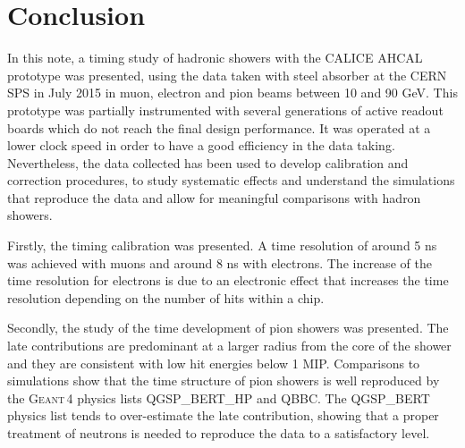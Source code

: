 \documentclass{JINST}
\newcommand\geant{\textsc{Geant\,4}\xspace}
\newcommand\ddhep{\textsc{DD4hep}\xspace}
\begin{document}

\section{Conclusion}

In this note, a timing study of hadronic showers with the CALICE AHCAL prototype was presented, using the data taken with steel absorber at the CERN SPS in July 2015 in muon, electron and pion beams between 10 and 90 GeV. This prototype was partially instrumented with several generations of active readout boards which do not reach the final design performance. It was operated at a lower clock speed in order to have a good efficiency in the data taking. Nevertheless, the data collected has been used to develop calibration and correction procedures, to study systematic effects and understand the simulations that reproduce the data and allow for meaningful comparisons with hadron showers.

Firstly, the timing calibration was presented. A time resolution of around 5 ns was achieved with muons and around 8 ns with electrons. The increase of the time resolution for electrons is due to an electronic effect that increases the time resolution depending on the number of hits within a chip.

Secondly, the study of the time development of pion showers was presented. The late contributions are predominant at a larger radius from the core of the shower and they are consistent with low hit energies below 1 MIP. Comparisons to simulations show that the time structure of pion showers is well reproduced by the \geant physics lists QGSP\_BERT\_HP and QBBC. The QGSP\_BERT physics list tends to over-estimate the late contribution, showing that a proper treatment of neutrons is needed to reproduce the data to a satisfactory level.
\end{document}
